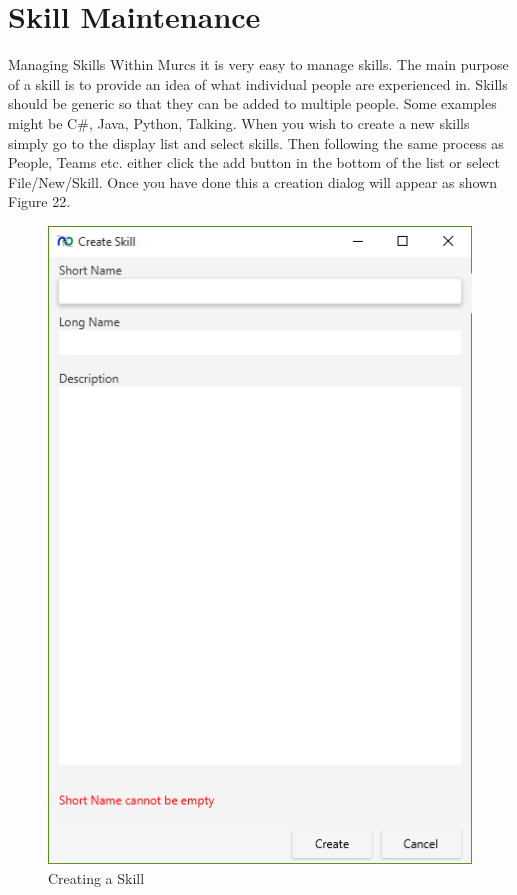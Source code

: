 \section{Skill Maintenance}

Managing Skills
\newline\newline
Within Murcs it is very easy to manage skills. The main purpose of a skill is to provide an idea of what individual people are experienced in. Skills should be generic so that they can be added to multiple people. Some examples might be C\#, Java, Python, Talking.
\newline
When you wish to create a new skills simply go to the display list and select skills. Then following the same process as People, Teams etc. either click the add button in the bottom of the list or select File/New/Skill. Once you have done this a creation dialog will appear as shown Figure 22.

\begin{figure}[H]
\centering
\includegraphics[width=\textwidth]{images/screenshots/skills1.PNG}
\caption{Creating a Skill}
\label{fig:new_project}
\end{figure}

